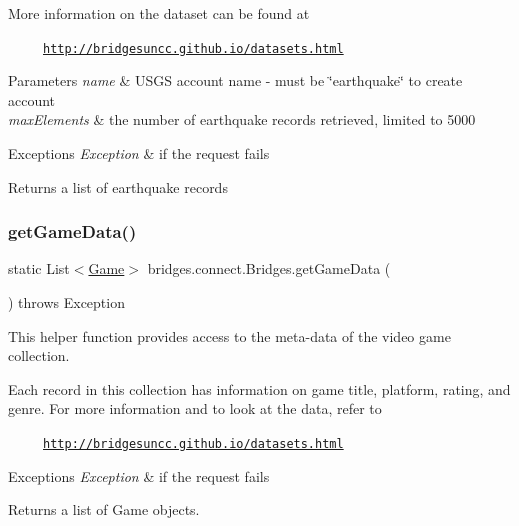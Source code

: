 More information on the dataset can be found at 

~~~~~\href{http://bridgesuncc.github.io/datasets.html}{\tt http\+://bridgesuncc.\+github.\+io/datasets.\+html} 


\begin{DoxyParams}{Parameters}
{\em name} & U\+S\+GS account name -\/ must be \char`\"{}earthquake\char`\"{} to create account \\
\hline
{\em max\+Elements} & the number of earthquake records retrieved, limited to 5000 \\
\hline
\end{DoxyParams}

\begin{DoxyExceptions}{Exceptions}
{\em Exception} & if the request fails\\
\hline
\end{DoxyExceptions}
\begin{DoxyReturn}{Returns}
a list of earthquake records 
\end{DoxyReturn}
\mbox{\label{classbridges_1_1connect_1_1_bridges_a594808b9dada5c825ac00ae0c97c9e9b}} 
\subsubsection{\texorpdfstring{get\+Game\+Data()}{getGameData()}}
{\footnotesize\ttfamily static List$<$\mbox{\hyperlink{classbridges_1_1data__src__dependent_1_1_game}{Game}}$>$ bridges.\+connect.\+Bridges.\+get\+Game\+Data (\begin{DoxyParamCaption}{ }\end{DoxyParamCaption}) throws Exception\hspace{0.3cm}{\ttfamily [static]}}

This helper function provides access to the meta-\/data of the video game collection.

Each record in this collection has information on game title, platform, rating, and genre. For more information and to look at the data, refer to 

~~~~~\href{http://bridgesuncc.github.io/datasets.html}{\tt http\+://bridgesuncc.\+github.\+io/datasets.\+html} 


\begin{DoxyExceptions}{Exceptions}
{\em Exception} & if the request fails\\
\hline
\end{DoxyExceptions}
\begin{DoxyReturn}{Returns}
a list of Game objects. 
\end{DoxyReturn}
\mbox{\label{classbridges_1_1connect_1_1_bridges_a7847b5a45cae8491acd5b6fb0015415b}} 
